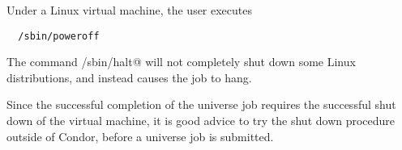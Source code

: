 Under a Linux virtual machine,
the  user executes
\begin{verbatim}
  /sbin/poweroff
\end{verbatim}
The command \verb@/sbin/halt@ will not completely
shut down some Linux distributions, and instead
causes the job to hang.

Since the successful completion of the  universe job
requires the successful shut down of the virtual machine,
it is good advice to try the shut down procedure outside of
Condor, before a  universe job is submitted.


